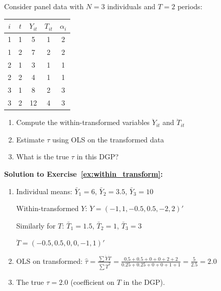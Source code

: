 \begin{exercise}
\label{ex:within_transform}
Consider panel data with $N=3$ individuals and $T=2$ periods:

\begin{center}
\begin{tabular}{ccc|cc}
$i$ & $t$ & $Y_{it}$ & $T_{it}$ & $\alpha_i$ \\
\hline
1 & 1 & 5 & 1 & 2 \\
1 & 2 & 7 & 2 & 2 \\
2 & 1 & 3 & 1 & 1 \\
2 & 2 & 4 & 1 & 1 \\
3 & 1 & 8 & 2 & 3 \\
3 & 2 & 12 & 4 & 3 \\
\end{tabular}
\end{center}

\begin{enumerate}
    \item[(a)] Compute the within-transformed variables $\ddot{Y}_{it}$ and $\ddot{T}_{it}$
    \item[(b)] Estimate $\tau$ using OLS on the transformed data
    \item[(c)] What is the true $\tau$ in this DGP?
\end{enumerate}
\end{exercise}

\textbf{Solution to Exercise~\ref{ex:within_transform}:}

\begin{enumerate}
    \item[(a)] Individual means: $\bar{Y}_1 = 6$, $\bar{Y}_2 = 3.5$, $\bar{Y}_3 = 10$

    Within-transformed $Y$: $\ddot{Y} = (-1, 1, -0.5, 0.5, -2, 2)'$

    Similarly for $T$: $\bar{T}_1 = 1.5$, $\bar{T}_2 = 1$, $\bar{T}_3 = 3$

    $\ddot{T} = (-0.5, 0.5, 0, 0, -1, 1)'$

    \item[(b)] OLS on transformed: $\hat{\tau} = \frac{\sum \ddot{Y} \ddot{T}}{\sum \ddot{T}^2} = \frac{0.5 + 0.5 + 0 + 0 + 2 + 2}{0.25 + 0.25 + 0 + 0 + 1 + 1} = \frac{5}{2.5} = 2.0$

    \item[(c)] The true $\tau = 2.0$ (coefficient on $T$ in the DGP).
\end{enumerate}

